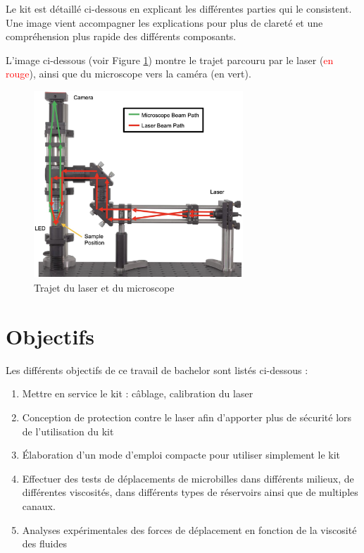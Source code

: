 Le kit est détaillé ci-dessous en explicant les différentes parties qui le consistent. Une image vient accompagner les explications pour plus de clareté et une compréhension plus rapide des différents composants.

L'image ci-dessous (voir Figure \ref{chemin_laser_caméra}) montre le trajet parcouru par le laser (\textcolor{red}{en rouge}), ainsi que du microscope vers la caméra (\textcolor[RGB]{0, 120, 0}{en vert}).

\begin{figure}[H]
    \begin{center}
        \includegraphics[width=0.7\textwidth]{assets/figures/figures_introduction/chemin_laser_camera.jpeg}
    \end{center}
    \caption{Trajet du laser et du microscope}
    \label{chemin_laser_caméra}
\end{figure}

\section{Objectifs}

Les différents objectifs de ce travail de bachelor sont listés ci-dessous :
\begin{enumerate}
    \item Mettre en service le kit : câblage, calibration du laser
    \item Conception de protection contre le laser afin d'apporter plus de sécurité lors de l'utilisation du kit
    \item Élaboration d'un mode d'emploi compacte pour utiliser simplement le kit
    \item Effectuer des tests de déplacements de microbilles dans différents milieux, de différentes viscosités, dans différents types de réservoirs ainsi que de multiples canaux.
    \item Analyses expérimentales des forces de déplacement en fonction de la viscosité des fluides
\end{enumerate}


